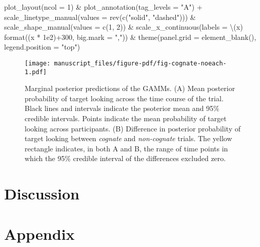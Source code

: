 \documentclass[
  letterpaper,
  DIV=11,
  numbers=noendperiod]{scrartcl}
\newenvironment{Shaded}{\begin{snugshade}}{\end{snugshade}}
\newcommand{\AttributeTok}[1]{\textcolor[rgb]{0.40,0.45,0.13}{#1}}
\newcommand{\DecValTok}[1]{\textcolor[rgb]{0.68,0.00,0.00}{#1}}
\newcommand{\FloatTok}[1]{\textcolor[rgb]{0.68,0.00,0.00}{#1}}
\newcommand{\FunctionTok}[1]{\textcolor[rgb]{0.28,0.35,0.67}{#1}}
\newcommand{\NormalTok}[1]{\textcolor[rgb]{0.00,0.23,0.31}{#1}}
\newcommand{\SpecialCharTok}[1]{\textcolor[rgb]{0.37,0.37,0.37}{#1}}
\newcommand{\StringTok}[1]{\textcolor[rgb]{0.13,0.47,0.30}{#1}}
\begin{document}
\begin{Shaded}
\begin{Highlighting}[]
    \FunctionTok{plot\_layout}\NormalTok{(}\AttributeTok{ncol =} \DecValTok{1}\NormalTok{) }\SpecialCharTok{\&}
    \FunctionTok{plot\_annotation}\NormalTok{(}\AttributeTok{tag\_levels =} \StringTok{"A"}\NormalTok{) }\SpecialCharTok{+}
    \FunctionTok{scale\_linetype\_manual}\NormalTok{(}\AttributeTok{values =} \FunctionTok{rev}\NormalTok{(}\FunctionTok{c}\NormalTok{(}\StringTok{"solid"}\NormalTok{, }\StringTok{"dashed"}\NormalTok{))) }\SpecialCharTok{\&}
    \FunctionTok{scale\_shape\_manual}\NormalTok{(}\AttributeTok{values =} \FunctionTok{c}\NormalTok{(}\DecValTok{1}\NormalTok{, }\DecValTok{2}\NormalTok{)) }\SpecialCharTok{\&}
    \FunctionTok{scale\_x\_continuous}\NormalTok{(}\AttributeTok{labels =}\NormalTok{ \textbackslash{}(x) }\FunctionTok{format}\NormalTok{((x }\SpecialCharTok{*} \FloatTok{1e2}\NormalTok{)}\SpecialCharTok{+}\DecValTok{300}\NormalTok{, }
                                            \AttributeTok{big.mark =} \StringTok{","}\NormalTok{)) }\SpecialCharTok{\&}
    \FunctionTok{theme}\NormalTok{(}\AttributeTok{panel.grid =} \FunctionTok{element\_blank}\NormalTok{(),}
          \AttributeTok{legend.position =} \StringTok{"top"}\NormalTok{) }
\end{Highlighting}
\end{Shaded}

\begin{figure}[H]

{\centering \texttt{[image: manuscript\_files/figure-pdf/fig-cognate-noeach-1.pdf]}

}

\caption{\label{fig-cognate-noeach}Marginal posterior predictions of the
GAMMs. (A) Mean posterior probability of target looking across the time
course of the trial. Black lines and intervals indicate the psoterior
mean and 95\% credible intervals. Points indicate the mean probability
of target looking across participants. (B) Difference in posterior
probability of target looking between \emph{cognate} and
\emph{non-cognate} trials. The yellow rectangle indicates, in both A and
B, the range of time points in which the 95\% credible interval of the
differences excluded zero.}

\end{figure}

\hypertarget{discussion}{%
\section{Discussion}\label{discussion}}

\hypertarget{appendix}{%
\section{Appendix}\label{appendix}}
\end{document}
